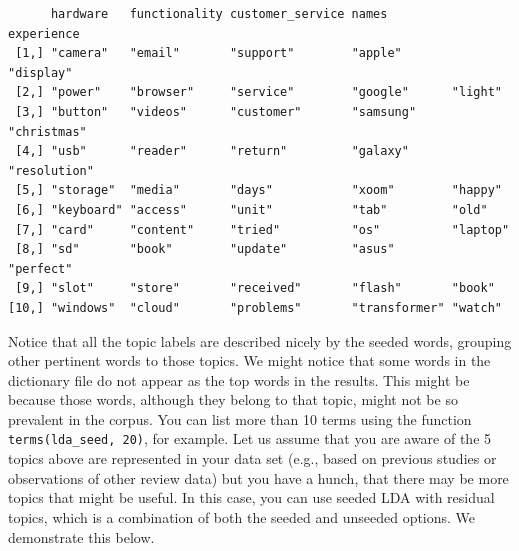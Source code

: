 \begin{Shaded}
\begin{Highlighting}[]
\OtherTok{\textless{}{-}} \NormalTok{(} \NormalTok{)}

\NormalTok{(}\NormalTok{)}
\OtherTok{\textless{}{-}}  \NormalTok{)}
\end{Highlighting}
\end{Shaded}

\begin{verbatim}
      hardware   functionality customer_service names         experience  
 [1,] "camera"   "email"       "support"        "apple"       "display"   
 [2,] "power"    "browser"     "service"        "google"      "light"     
 [3,] "button"   "videos"      "customer"       "samsung"     "christmas" 
 [4,] "usb"      "reader"      "return"         "galaxy"      "resolution"
 [5,] "storage"  "media"       "days"           "xoom"        "happy"     
 [6,] "keyboard" "access"      "unit"           "tab"         "old"       
 [7,] "card"     "content"     "tried"          "os"          "laptop"    
 [8,] "sd"       "book"        "update"         "asus"        "perfect"   
 [9,] "slot"     "store"       "received"       "flash"       "book"      
[10,] "windows"  "cloud"       "problems"       "transformer" "watch"     
\end{verbatim}

Notice that all the topic labels are described nicely
by the seeded words, grouping other pertinent words to those
topics. We might notice that some words in the dictionary file do not
appear as the top words in the results. This might be because those words, although they belong to that topic, might not be so
prevalent in the corpus. You can list more than 10 terms using the
function \texttt{terms(lda\_seed,\ 20)}, for example. Let us assume that
you are aware of the 5 topics above are represented in your data set
(e.g., based on previous studies or observations of other review data)
but you have a hunch, that there may be more topics that might be useful. In this case, you can use seeded LDA with residual
topics, which is a combination of both the seeded and unseeded options. We
demonstrate this below.

